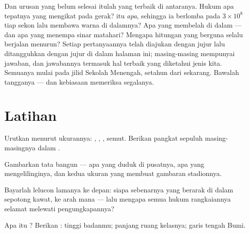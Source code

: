 \begin{remark}\label{rem:g9:atoms-to-galaxies:ahead}
Dan urusan yang belum selesai itulah yang terbaik di antaranya. Hukum
apa tepatnya yang mengikat  pada gerak?  itu \emph{apa},
sehingga ia berlomba pada $3 \times 10^{8}$  tiap sekon lalu
membawa warna di dalamnya? Apa yang membelah di dalam  --- dan
apa yang menempa sinar matahari? Mengapa hitungan  yang berguna
selalu berjalan menurun? Setiap pertanyaannya telah diajukan dengan
jujur lalu ditangguhkan dengan jujur di dalam halaman ini;
masing-masing mempunyai jawaban, dan jawabannya termasuk hal terbaik
yang diketahui jenis kita. Semuanya mulai pada jilid Sekolah Menengah,
setahun dari sekarang. Bawalah tangganya --- dan kebiasaan memeriksa
segalanya.
\end{remark}

\section{Latihan}

\begin{exercise}[$\star$]\label{exo:g9:atoms-to-galaxies:1}
Urutkan menurut ukurannya: , , , semut. Berikan pangkat
sepuluh masing-masingnya dalam .
\end{exercise}

\begin{exercise}[$\star$]\label{exo:g9:atoms-to-galaxies:2}
Gambarkan tata bangun  --- apa yang duduk di pusatnya, apa yang
mengelilinginya, dan kedua ukuran yang membuat gambaran stadionnya.
\end{exercise}

\begin{exercise}[$\star$]\label{exo:g9:atoms-to-galaxies:3}
Bayarlah lelucon lamanya ke depan: siapa sebenarnya yang berarak di
dalam sepotong kawat, ke arah mana --- lalu mengapa semua hukum
rangkaiannya selamat melewati pengungkapannya?
\end{exercise}

\begin{exercise}[$\star$]\label{exo:g9:atoms-to-galaxies:4}
Apa itu ? Berikan : tinggi badanmu; panjang
ruang kelasnya; garis tengah Bumi.
\end{exercise}

